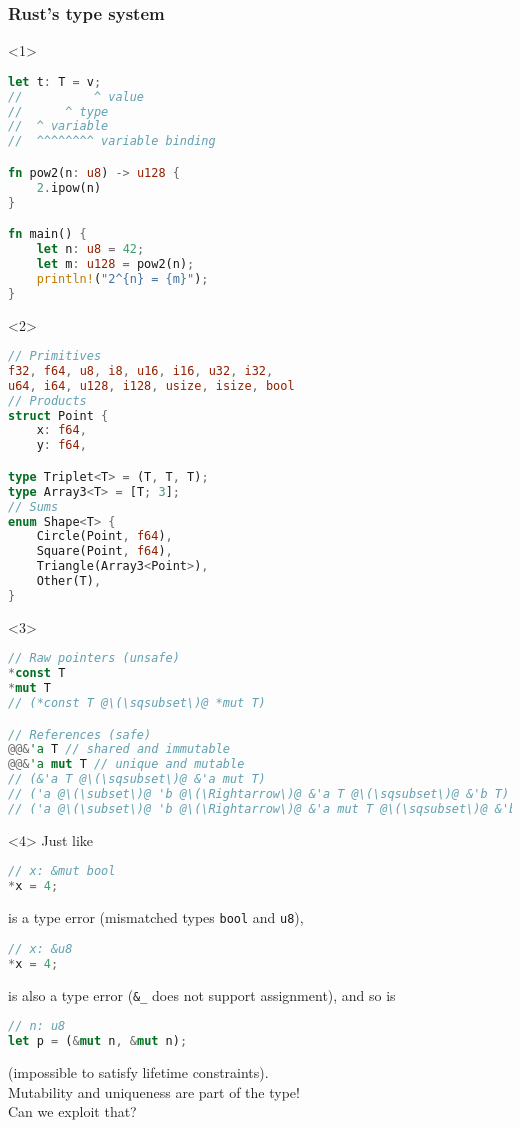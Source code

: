 \begin{frame}[fragile]
    \frametitle{Rust's type system}
    \begin{onlyenv}<1>
        \begin{lstlisting}[language=rust]
let t: T = v;
//          ^ value
//      ^ type
//  ^ variable
//  ^^^^^^^^ variable binding

fn pow2(n: u8) -> u128 {
    2.ipow(n)
}

fn main() {
    let n: u8 = 42;
    let m: u128 = pow2(n);
    println!("2^{n} = {m}");
}
        \end{lstlisting}
    \end{onlyenv}

    \begin{onlyenv}<2>
        \begin{lstlisting}[language=rust]
// Primitives
f32, f64, u8, i8, u16, i16, u32, i32,
u64, i64, u128, i128, usize, isize, bool
// Products
struct Point {
    x: f64,
    y: f64,

type Triplet<T> = (T, T, T);
type Array3<T> = [T; 3];
// Sums
enum Shape<T> {
    Circle(Point, f64),
    Square(Point, f64),
    Triangle(Array3<Point>),
    Other(T),
}
        \end{lstlisting}
    \end{onlyenv}

    \begin{onlyenv}<3>
        \begin{lstlisting}[language=rust, escapechar=@]
// Raw pointers (unsafe)
*const T
*mut T
// (*const T @\(\sqsubset\)@ *mut T)

// References (safe)
@@&'a T // shared and immutable
@@&'a mut T // unique and mutable
// (&'a T @\(\sqsubset\)@ &'a mut T)
// ('a @\(\subset\)@ 'b @\(\Rightarrow\)@ &'a T @\(\sqsubset\)@ &'b T)
// ('a @\(\subset\)@ 'b @\(\Rightarrow\)@ &'a mut T @\(\sqsubset\)@ &'b mut T)
        \end{lstlisting}
    \end{onlyenv}

    \begin{onlyenv}<4>
        Just like
        \begin{lstlisting}[language=rust]
// x: &mut bool
*x = 4;
        \end{lstlisting}
        is a type error (mismatched types \texttt{bool} and \texttt{u8}),
        \begin{lstlisting}[language=rust]
// x: &u8
*x = 4;
        \end{lstlisting}
        is also a type error (\texttt{\&\_} does not support assignment),
        and so is
        \begin{lstlisting}[language=rust]
// n: u8
let p = (&mut n, &mut n);
        \end{lstlisting}
        (impossible to satisfy lifetime constraints).\\

        Mutability and uniqueness are part of the type!\\
        Can we exploit that?
    \end{onlyenv}

\end{frame}

